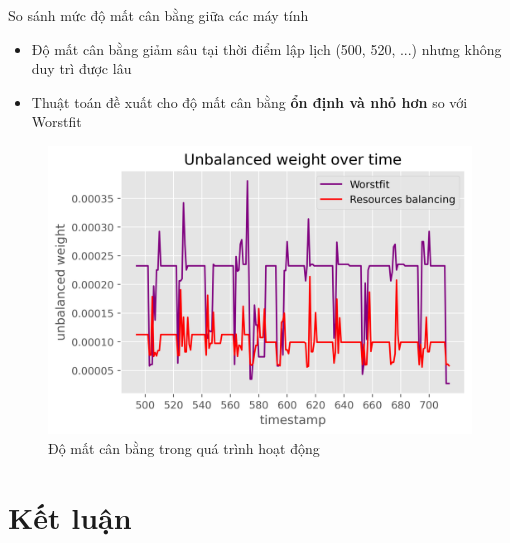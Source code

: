 \documentclass[11pt,xcolor={dvipsnames}, aspectratio=169]{beamer}
\begin{document}
\begin{frame}
{So sánh mức độ mất cân bằng giữa các máy tính}

\begin{minipage}[t]{0.4\linewidth}
	\vspace{0.5cm}
	\begin{itemize}
		\item Độ mất cân bằng giảm sâu tại thời điểm lập lịch (500, 520, ...) nhưng không duy trì được lâu 
		\item Thuật toán đề xuất cho độ mất cân bằng \textbf{ổn định và nhỏ hơn} so với Worstfit
	\end{itemize}
\end{minipage}
\hfill
\begin{minipage}[t]{0.59\linewidth}
	\begin{figure}[h!]
		\centering
		\includegraphics[scale=0.45]{images/unbalanced_weights.png}
		\caption{Độ mất cân bằng trong quá trình hoạt động}
	\end{figure}
\end{minipage}
\end{frame}

\section{Kết luận}
\end{document}
